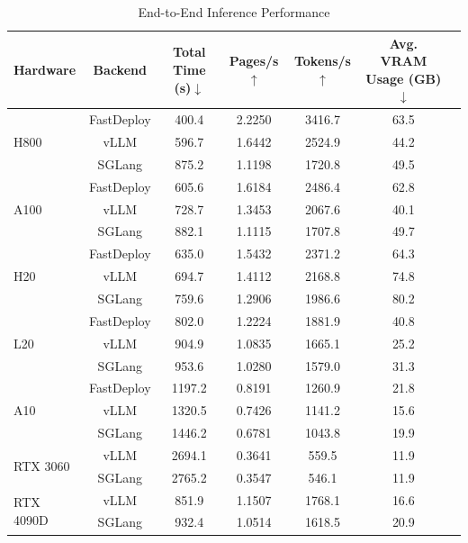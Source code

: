 \documentclass[11pt, a4paper,logo,  copyright, nonumbering]{paddleocr}
\begin{document}
\begin{table}[H]
  \renewcommand{\arraystretch}{1.2}
  \begin{tabular}{l|c|ccccc}
    \toprule
    \textbf{Hardware} & \textbf{Backend} & \textbf{Total Time (s)$\downarrow$} & \textbf{Pages/s$\uparrow$} & \textbf{Tokens/s$\uparrow$} & \textbf{Avg. VRAM Usage (GB)$\downarrow$} \\
    \midrule
    \multirow{3}{*}{H800} & FastDeploy & 400.4 & 2.2250 & 3416.7 & 63.5 \\ & vLLM & 596.7 & 1.6442 & 2524.9 & 44.2 \\
                          & SGLang & 875.2 & 1.1198 & 1720.8 & 49.5 \\
    \midrule
    \multirow{3}{*}{A100} & FastDeploy & 605.6 & 1.6184 & 2486.4 & 62.8 \\ & vLLM & 728.7 & 1.3453 & 2067.6 & 40.1 \\
                          & SGLang & 882.1 & 1.1115 & 1707.8 & 49.7 \\
    \midrule
    \multirow{3}{*}{H20} & FastDeploy & 635.0 & 1.5432 & 2371.2 & 64.3 \\ & vLLM & 694.7 & 1.4112 & 2168.8 & 74.8 \\
                          & SGLang & 759.6 & 1.2906 & 1986.6 & 80.2 \\
    \midrule
    \multirow{3}{*}{L20} & FastDeploy & 802.0 & 1.2224 & 1881.9 & 40.8 \\ & vLLM & 904.9 & 1.0835 & 1665.1 & 25.2 \\
                          & SGLang & 953.6 & 1.0280 & 1579.0 & 31.3 \\
    \midrule
    \multirow{3}{*}{A10} & FastDeploy & 1197.2 & 0.8191 & 1260.9 & 21.8 \\ & vLLM & 1320.5 & 0.7426 & 1141.2 & 15.6 \\
                          & SGLang & 1446.2 & 0.6781 & 1043.8 & 19.9 \\
    \midrule
    \multirow{2}{*}{RTX 3060} & vLLM & 2694.1 & 0.3641 & 559.5 & 11.9 \\
                              & SGLang & 2765.2 & 0.3547 & 546.1 & 11.9 \\
    \midrule
    \multirow{2}{*}{RTX 4090D} & vLLM & 851.9 & 1.1507 & 1768.1 & 16.6 \\
                               & SGLang & 932.4 & 1.0514 & 1618.5 & 20.9 \\
    \bottomrule
  \end{tabular}%
    \caption{End-to-End Inference Performance}
      \label{tab:inference_performance_hardware}
\end{table}
\end{document}
